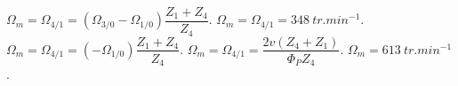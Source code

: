 \begin{corrigebox}[Corrigé]
$\Omega_m = \Omega_{4/1}=\left(\Omega_{3/0}-\Omega_{1/0} \right) \dfrac{Z_1 + Z_4 }{Z_4}$.
$\Omega_{m}=\Omega_{4/1}=\SI{348}{tr.min^{-1}}$.
$\Omega_m = \Omega_{4/1}=\left(-\Omega_{1/0} \right) \dfrac{Z_1 + Z_4 }{Z_4}$.
$\Omega_m = \Omega_{4/1}=\dfrac{2v \left(Z_4 + Z_1\right)}{\Phi_P Z_4}$.
$\Omega_m = \SI{613}{tr.min^{-1}}$.
\end{corrigebox}
